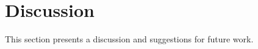 \chapter{Discussion} 

This section presents a discussion and suggestions for future work.













